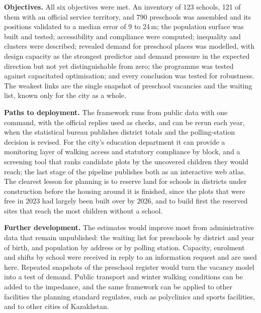 \textbf{Objectives.} All six objectives were met. An inventory of 123 schools, 121 of them with an official service territory, and 790 preschools was assembled and its positions validated to a median error of 9 to 24\,m; the population surface was built and tested; accessibility and compliance were computed; inequality and clusters were described; revealed demand for preschool places was modelled, with design capacity as the strongest predictor and demand pressure in the expected direction but not yet distinguishable from zero; the programme was tested against capacitated optimisation; and every conclusion was tested for robustness. The weakest links are the single snapshot of preschool vacancies and the waiting list, known only for the city as a whole.

\textbf{Paths to deployment.} The framework runs from public data with one command, with the official replies used as checks, and can be rerun each year, when the statistical bureau publishes district totals and the polling-station decision is revised. For the city's education department it can provide a monitoring layer of walking access and statutory compliance by block, and a screening tool that ranks candidate plots by the uncovered children they would reach; the last stage of the pipeline publishes both as an interactive web atlas. The clearest lesson for planning is to reserve land for schools in districts under construction before the housing around it is finished, since the plots that were free in 2023 had largely been built over by 2026, and to build first the reserved sites that reach the most children without a school.

\textbf{Further development.} The estimates would improve most from administrative data that remain unpublished: the waiting list for preschools by district and year of birth, and population by address or by polling station. Capacity, enrolment and shifts by school were received in reply to an information request and are used here. Repeated snapshots of the preschool register would turn the vacancy model into a test of demand. Public transport and winter walking conditions can be added to the impedance, and the same framework can be applied to other facilities the planning standard regulates, such as polyclinics and sports facilities, and to other cities of Kazakhstan.
